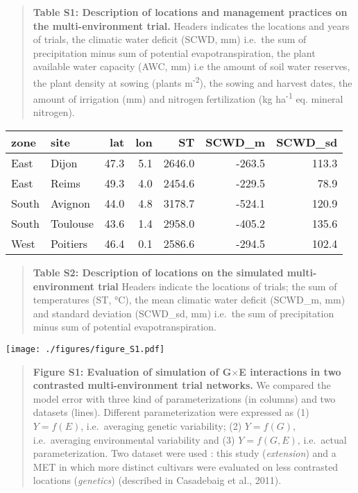 \documentclass[a4paper]{article}
\begin{document}
\normalsize

\begin{quote}
\textbf{Table S1: Description of locations and management practices on
the multi-environment trial.} Headers indicates the locations and years
of trials, the climatic water deficit (SCWD, mm) i.e.~the sum of
precipitation minus sum of potential evapotranspiration, the plant
available water capacity (AWC, mm) i.e the amount of soil water
reserves, the plant density at sowing (plants m\textsuperscript{-2}),
the sowing and harvest dates, the amount of irrigation (mm) and nitrogen
fertilization (kg ha\textsuperscript{-1} eq. mineral nitrogen).
\end{quote}

\begin{longtable}[]{@{}llrrrrr@{}}
\toprule
zone & site & lat & lon & ST & SCWD\_m & SCWD\_sd\tabularnewline
\midrule
\endhead
East & Dijon & 47.3 & 5.1 & 2646.0 & -263.5 & 113.3\tabularnewline
East & Reims & 49.3 & 4.0 & 2454.6 & -229.5 & 78.9\tabularnewline
South & Avignon & 44.0 & 4.8 & 3178.7 & -524.1 & 120.9\tabularnewline
South & Toulouse & 43.6 & 1.4 & 2958.0 & -405.2 & 135.6\tabularnewline
West & Poitiers & 46.4 & 0.1 & 2586.6 & -294.5 & 102.4\tabularnewline
\bottomrule
\end{longtable}

\begin{quote}
\textbf{Table S2: Description of locations on the simulated
multi-environment trial} Headers indicate the locations of trials; the
sum of temperatures (ST, °C), the mean climatic water deficit (SCWD\_m,
mm) and standard deviation (SCWD\_sd, mm) i.e.~the sum of precipitation
minus sum of potential evapotranspiration.
\end{quote}

\texttt{[image: ./figures/figure\_S1.pdf]}

\begin{quote}
\textbf{Figure S1: Evaluation of simulation of G\(\times\)E interactions
in two contrasted multi-environment trial networks.} We compared the
model error with three kind of parameterizations (in columns) and two
datasets (lines). Different parameterization were expressed as (1)
\(Y = f(E)\), i.e.~averaging genetic variability; (2) \(Y = f(G)\),
i.e.~averaging environmental variability and (3) \(Y = f(G, E)\),
i.e.~actual parameterization. Two dataset were used : this study
(\emph{extension}) and a MET in which more distinct cultivars were
evaluated on less contrasted locations (\emph{genetics}) (described in
Casadebaig et al., 2011).
\end{quote}
\end{document}
